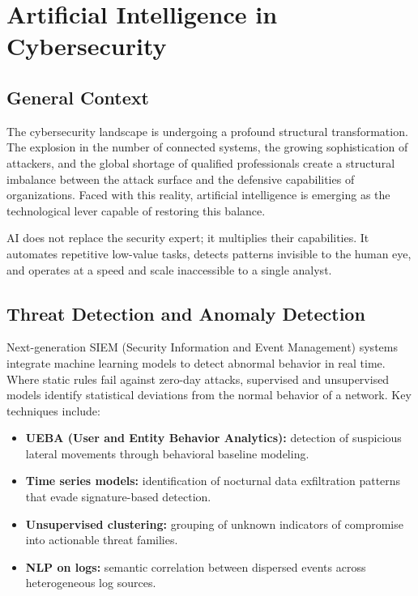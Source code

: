 \documentclass[12pt,a4paper]{report}
\begin{document}
\section{Artificial Intelligence in Cybersecurity}

\subsection{General Context}

The cybersecurity landscape is undergoing a profound structural transformation.
The explosion in the number of connected systems, the growing sophistication of
attackers, and the global shortage of qualified professionals create a structural
imbalance between the attack surface and the defensive capabilities of organizations.
Faced with this reality, artificial intelligence is emerging as the technological
lever capable of restoring this balance.

AI does not replace the security expert; it multiplies their capabilities. It
automates repetitive low-value tasks, detects patterns invisible to the human eye,
and operates at a speed and scale inaccessible to a single analyst.

\subsection{Threat Detection and Anomaly Detection}

Next-generation SIEM (Security Information and Event Management) systems integrate
machine learning models to detect abnormal behavior in real time. Where static rules
fail against zero-day attacks, supervised and unsupervised models identify statistical
deviations from the normal behavior of a network. Key techniques include:

\begin{itemize}
    \item \textbf{UEBA (User and Entity Behavior Analytics):} detection of suspicious
    lateral movements through behavioral baseline modeling.
    \item \textbf{Time series models:} identification of nocturnal data exfiltration
    patterns that evade signature-based detection.
    \item \textbf{Unsupervised clustering:} grouping of unknown indicators of
    compromise into actionable threat families.
    \item \textbf{NLP on logs:} semantic correlation between dispersed events across
    heterogeneous log sources.
\end{itemize}
\end{document}
